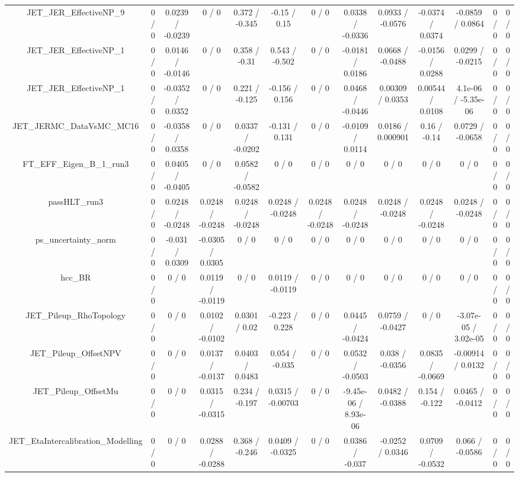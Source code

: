 \documentclass[10pt]{article}
\begin{document}
\begin{table}[htbp]
\begin{center}
\begin{tabular}{|c|c|c|c|c|c|c|c|c|c|c|c|c|}
  JET_JER_EffectiveNP_9 & 0 / 0 & 0.0239 / -0.0239 & 0 / 0 & 0.372 / -0.345 & -0.15 / 0.15 & 0 / 0 & 0.0338 / -0.0336 & 0.0933 / -0.0576 & -0.0374 / 0.0374 & -0.0859 / 0.0864 & 0 / 0 & 0 / 0 \\ 
  JET_JER_EffectiveNP_1 & 0 / 0 & 0.0146 / -0.0146 & 0 / 0 & 0.358 / -0.31 & 0.543 / -0.502 & 0 / 0 & -0.0181 / 0.0186 & 0.0668 / -0.0488 & -0.0156 / 0.0288 & 0.0299 / -0.0215 & 0 / 0 & 0 / 0 \\ 
  JET_JER_EffectiveNP_1 & 0 / 0 & -0.0352 / 0.0352 & 0 / 0 & 0.221 / -0.125 & -0.156 / 0.156 & 0 / 0 & 0.0468 / -0.0446 & 0.00309 / 0.0353 & 0.00544 / 0.0108 & 4.1e-06 / -5.35e-06 & 0 / 0 & 0 / 0 \\ 
  JET_JERMC_DataVsMC_MC16 & 0 / 0 & -0.0358 / 0.0358 & 0 / 0 & 0.0337 / -0.0202 & -0.131 / 0.131 & 0 / 0 & -0.0109 / 0.0114 & 0.0186 / 0.000901 & 0.16 / -0.14 & 0.0729 / -0.0658 & 0 / 0 & 0 / 0 \\ 
  FT_EFF_Eigen_B_1_run3 & 0 / 0 & 0.0405 / -0.0405 & 0 / 0 & 0.0582 / -0.0582 & 0 / 0 & 0 / 0 & 0 / 0 & 0 / 0 & 0 / 0 & 0 / 0 & 0 / 0 & 0 / 0 \\ 
  passHLT_run3 & 0 / 0 & 0.0248 / -0.0248 & 0.0248 / -0.0248 & 0.0248 / -0.0248 & 0.0248 / -0.0248 & 0.0248 / -0.0248 & 0.0248 / -0.0248 & 0.0248 / -0.0248 & 0.0248 / -0.0248 & 0.0248 / -0.0248 & 0 / 0 & 0 / 0 \\ 
  ps_uncertainty_norm & 0 / 0 & -0.031 / 0.0309 & -0.0305 / 0.0305 & 0 / 0 & 0 / 0 & 0 / 0 & 0 / 0 & 0 / 0 & 0 / 0 & 0 / 0 & 0 / 0 & 0 / 0 \\ 
  hcc_BR & 0 / 0 & 0 / 0 & 0.0119 / -0.0119 & 0 / 0 & 0.0119 / -0.0119 & 0 / 0 & 0 / 0 & 0 / 0 & 0 / 0 & 0 / 0 & 0 / 0 & 0 / 0 \\ 
  JET_Pileup_RhoTopology & 0 / 0 & 0 / 0 & 0.0102 / -0.0102 & 0.0301 / 0.02 & -0.223 / 0.228 & 0 / 0 & 0.0445 / -0.0424 & 0.0759 / -0.0427 & 0 / 0 & -3.07e-05 / 3.02e-05 & 0 / 0 & 0 / 0 \\ 
  JET_Pileup_OffsetNPV & 0 / 0 & 0 / 0 & 0.0137 / -0.0137 & 0.0403 / 0.0483 & 0.054 / -0.035 & 0 / 0 & 0.0532 / -0.0503 & 0.038 / -0.0356 & 0.0835 / -0.0669 & -0.00914 / 0.0132 & 0 / 0 & 0 / 0 \\ 
  JET_Pileup_OffsetMu & 0 / 0 & 0 / 0 & 0.0315 / -0.0315 & 0.234 / -0.197 & 0.0315 / -0.00703 & 0 / 0 & -9.45e-06 / 8.93e-06 & 0.0482 / -0.0388 & 0.154 / -0.122 & 0.0465 / -0.0412 & 0 / 0 & 0 / 0 \\ 
  JET_EtaIntercalibration_Modelling & 0 / 0 & 0 / 0 & 0.0288 / -0.0288 & 0.368 / -0.246 & 0.0409 / -0.0325 & 0 / 0 & 0.0386 / -0.037 & -0.0252 / 0.0346 & 0.0709 / -0.0532 & 0.066 / -0.0586 & 0 / 0 & 0 / 0 \\ 

\end{tabular}
\end{center}
\end{table}
\end{document}

